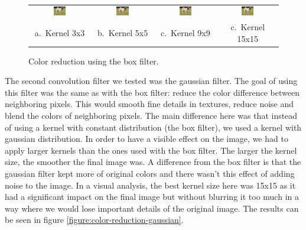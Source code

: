 \documentclass[]{IEEEtran}
\begin{document}
    \begin{figure}[t]
      \centering
      \begin{tabular}{c c c c}
      \includegraphics[width=0.22\textwidth]{./figures/3/dog-3-1-1-box3.jpg} &
      \includegraphics[width=0.22\textwidth]{./figures/3/dog-3-1-1-box5.jpg} &
      \includegraphics[width=0.22\textwidth]{./figures/3/dog-3-1-1-box9.jpg} &
      \includegraphics[width=0.22\textwidth]{./figures/3/dog-3-1-1-box15.jpg} \\
      a.~Kernel 3x3 & b.~Kernel 5x5 & c.~Kernel 9x9 & c.~Kernel 15x15
      \end{tabular}
      \caption{Color reduction using the box filter.}
      \label{figure:color-reduction-box}
    \end{figure}

  The second convolution filter we tested was the gaussian filter.
  The goal of using this filter was the same as with the box filter: reduce the color difference between neighboring pixels.
  This would smooth fine details in textures, reduce noise and blend the colors of neighboring pixels.
  The main difference here was that instead of using a kernel with constant distribution (the box filter), we used
  a kernel with gaussian distribution.
  In order to have a visible effect on the image, we had to apply larger kernels than the ones used with the box filter.
  The larger the kernel size, the smoother the final image was.
  A difference from the box filter is that the gaussian filter kept more of
  original colors and there wasn't this effect of adding noise to the image.
  In a visual analysis, the best kernel size here was 15x15 as it had a significant impact on the final image but without
  blurring it too much in a way where we would lose important details of the original image.
  The results can be seen in figure \ref{figure:color-reduction-gaussian}.
\end{document}
